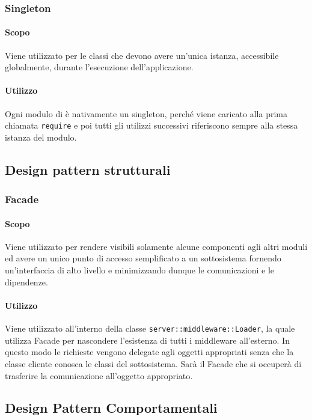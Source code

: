 \documentclass[12pt,a4paper]{article}
\begin{document}
\subsubsection{Singleton}
\paragraph{Scopo}
Viene utilizzato per le classi che devono avere un’unica istanza, accessibile globalmente, durante l’esecuzione dell’applicazione.
\paragraph{Utilizzo}
Ogni modulo di  è nativamente un singleton, perché viene caricato alla prima chiamata \texttt{require} e poi tutti gli utilizzi successivi riferiscono sempre alla stessa istanza del modulo.

\subsection{Design pattern strutturali}

\subsubsection{Facade}
\paragraph{Scopo}
Viene utilizzato per rendere visibili solamente alcune componenti agli altri moduli ed avere un unico punto di accesso semplificato a un sottosistema fornendo un’interfaccia di alto livello e minimizzando dunque le comunicazioni e le dipendenze.

\paragraph{Utilizzo}
Viene utilizzato all’interno della classe \texttt{server::middleware::Loader}, la quale utilizza Facade per nascondere l’esistenza di tutti i middleware all'esterno. In questo modo le richieste vengono delegate agli oggetti appropriati senza che la classe cliente conosca le classi del sottosistema. Sarà il Facade che si occuperà di trasferire la comunicazione all’oggetto appropriato.

\subsection{Design Pattern Comportamentali}
\end{document}
